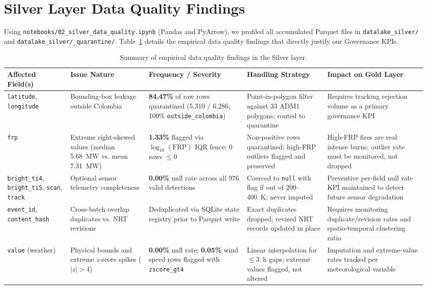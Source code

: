 \documentclass[11pt,letterpaper]{article}
\begin{document}
\section{Silver Layer Data Quality Findings}

Using \texttt{notebooks/02\_silver\_data\_quality.ipynb} (Pandas and PyArrow), we profiled all accumulated Parquet files in \texttt{datalake\_silver/} and \texttt{datalake\_silver/\_quarantine/}. Table~\ref{tab:dq_findings} details the empirical data quality findings that directly justify our Governance KPIs.

\begin{table}[H]
  \centering
  \small
  \begin{tabularx}{\textwidth}{p{2.6cm} p{2.4cm} p{2.3cm} p{2.5cm} X}
    \toprule
    \textbf{Affected Field(s)} & \textbf{Issue Nature} & \textbf{Frequency / Severity} & \textbf{Handling Strategy} & \textbf{Impact on Gold Layer} \\
    \midrule
    \texttt{latitude}, \texttt{longitude} & Bounding-box leakage outside Colombia & \textbf{84.47\%} of raw rows quarantined (5,310 / 6,286; 100\% \texttt{outside\_colombia}) & Point-in-polygon filter against 33 ADM1 polygons; routed to quarantine & Requires tracking rejection volume as a primary governance KPI \\
    \addlinespace
    \texttt{frp} & Extreme right-skewed values (median 5.68~MW vs. mean 7.31~MW) & \textbf{1.33\%} flagged via $\log_{10}(\text{FRP})$ IQR fence; 0 rows $\le 0$ & Non-positive rows quarantined; high-FRP outliers flagged and preserved & High-FRP fires are real intense burns; outlier rate must be monitored, not dropped \\
    \addlinespace
    \texttt{bright\_ti4}, \texttt{bright\_ti5}, \texttt{scan}, \texttt{track} & Optional sensor telemetry completeness & \textbf{0.00\%} null rate across all 976 valid detections & Coerced to \texttt{null} with flag if out of 200--400~K; never imputed & Preventive per-field null rate KPI maintained to detect future sensor degradation \\
    \addlinespace
    \texttt{event\_id}, \texttt{content\_hash} & Cross-batch overlap duplicates vs. NRT revisions & Deduplicated via SQLite state registry prior to Parquet write & Exact duplicates dropped; revised NRT records updated in place & Requires monitoring duplicate/revision rates and spatio-temporal clustering ratio \\
    \addlinespace
    \texttt{value} (weather) & Physical bounds and extreme $z$-score spikes ($|z|>4$) & \textbf{0.00\%} null rate; \textbf{0.05\%} wind speed rows flagged with \texttt{zscore\_gt4} & Linear interpolation for $\le 3$~h gaps; extreme values flagged, not altered & Imputation and extreme-value rates tracked per meteorological variable \\
    \bottomrule
  \end{tabularx}
  \caption{Summary of empirical data quality findings in the Silver layer.}
  \label{tab:dq_findings}
\end{table}
\end{document}
